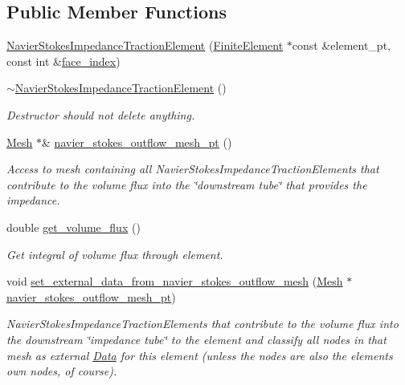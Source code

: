 \subsection*{Public Member Functions}
\begin{DoxyCompactItemize}
\item 
\hyperlink{classoomph_1_1NavierStokesImpedanceTractionElement_a6d3191bb5be1c304b71e24140017eab5}{Navier\+Stokes\+Impedance\+Traction\+Element} (\hyperlink{classoomph_1_1FiniteElement}{Finite\+Element} $\ast$const \&element\+\_\+pt, const int \&\hyperlink{classoomph_1_1FaceElement_a478d577ac6db67ecc80f1f02ae3ab170}{face\+\_\+index})
\item 
\hyperlink{classoomph_1_1NavierStokesImpedanceTractionElement_a19a1379dee4fab03c2f8574665bc4184}{$\sim$\+Navier\+Stokes\+Impedance\+Traction\+Element} ()
\begin{DoxyCompactList}\small\item\em Destructor should not delete anything. \end{DoxyCompactList}\item 
\hyperlink{classoomph_1_1Mesh}{Mesh} $\ast$\& \hyperlink{classoomph_1_1NavierStokesImpedanceTractionElement_a6ddd1fa5b0e8c498aa1fc03f4492ee34}{navier\+\_\+stokes\+\_\+outflow\+\_\+mesh\+\_\+pt} ()
\begin{DoxyCompactList}\small\item\em Access to mesh containing all Navier\+Stokes\+Impedance\+Traction\+Elements that contribute to the volume flux into the \char`\"{}downstream tube\char`\"{} that provides the impedance. \end{DoxyCompactList}\item 
double \hyperlink{classoomph_1_1NavierStokesImpedanceTractionElement_a853055ebb50a6500602288a6f0563852}{get\+\_\+volume\+\_\+flux} ()
\begin{DoxyCompactList}\small\item\em Get integral of volume flux through element. \end{DoxyCompactList}\item 
void \hyperlink{classoomph_1_1NavierStokesImpedanceTractionElement_afd73c927eab27d77f54d83c67ef84a0f}{set\+\_\+external\+\_\+data\+\_\+from\+\_\+navier\+\_\+stokes\+\_\+outflow\+\_\+mesh} (\hyperlink{classoomph_1_1Mesh}{Mesh} $\ast$\hyperlink{classoomph_1_1NavierStokesImpedanceTractionElement_a6ddd1fa5b0e8c498aa1fc03f4492ee34}{navier\+\_\+stokes\+\_\+outflow\+\_\+mesh\+\_\+pt})
\begin{DoxyCompactList}\small\item\em Navier\+Stokes\+Impedance\+Traction\+Elements that contribute to the volume flux into the downstream \char`\"{}impedance tube\char`\"{} to the element and classify all nodes in that mesh as external \hyperlink{classoomph_1_1Data}{Data} for this element (unless the nodes are also the element\textquotesingle{}s own nodes, of course). \end{DoxyCompactList}\item 

\end{DoxyCompactItemize}
